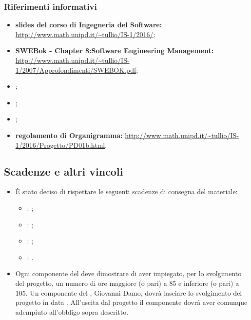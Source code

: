		\subsubsection{Riferimenti informativi}
		\begin{itemize}
				\item \textbf{slides del corso di Ingegneria del Software:}\\
                \url{http://www.math.unipd.it/~tullio/IS-1/2016/};
                \item \textbf{SWEBok - Chapter 8:Software Engineering Management:}\\
                \url{http://www.math.unipd.it/~tullio/IS-1/2007/Approfondimenti/SWEBOK.pdf};
				\item {\sdfv};
				\item {\pdqv};
				\item {\adrv};
				\item \textbf{regolamento di Organigramma:}
				\url{http://www.math.unipd.it/~tullio/IS-1/2016/Progetto/PD01b.html}.
		\end{itemize}
	\subsection {Scadenze e altri vincoli}
	\label{subsec:scadenze}
	\begin{itemize}
	\item
		È stato deciso di rispettare le seguenti scadenze di consegna del materiale:
		\begin{itemize}
			 \item {\revereq}: ;
			 \item {\revprog}: ;
			 \item {\revaqual}: ;
			 \item {\revacc}: .
		\end{itemize}
	\item
		Ogni componente del  deve dimostrare di aver impiegato, per lo svolgimento del progetto, un numero di ore maggiore (o pari) a 85 e inferiore (o pari) a 105.
		Un componente del , Giovanni Damo, dovrà lasciare lo svolgimento del progetto in data . All'uscita dal progetto il componente dovrà aver comunque adempiuto all'obbligo sopra descritto.
	\end{itemize}
